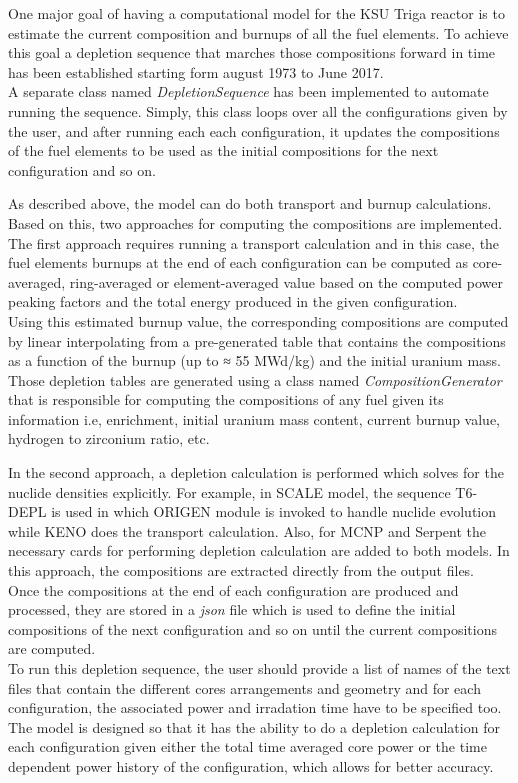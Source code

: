 \documentclass[review,number,sort&compress,12pt]{elsarticle}
\begin{document}
One major goal of having a computational model for the KSU Triga reactor is to estimate the current composition and burnups of all the fuel elements. To achieve this goal a depletion sequence that marches those compositions forward in time has been established starting form august 1973 to June 2017.\\
A separate class named \emph{DepletionSequence} has been implemented to automate running the sequence. 
Simply, this class loops over all the configurations given by the user, and after running each each configuration, it updates the compositions of the fuel elements to be used as the initial compositions for the next configuration and so on.

As described above, the model can do both transport and burnup calculations. Based on this, two approaches for computing the compositions are implemented.\\
The first approach requires running a transport calculation and in this case, the fuel elements burnups at the end of each configuration can be computed as core-averaged, ring-averaged or element-averaged value based on the computed power peaking factors and the total energy produced in the given configuration. \\
Using this estimated burnup value, the corresponding compositions are
computed by linear interpolating from a pre-generated table that contains the compositions as
a function of the burnup (up to ≈ 55 MWd/kg) and the initial uranium mass.
Those depletion tables are generated using a class named \emph{CompositionGenerator} that is responsible for computing the compositions of any fuel given its information i.e, enrichment, initial uranium mass content, current burnup value, hydrogen to zirconium ratio, etc.

In the second approach, a depletion calculation is performed which solves for the nuclide densities explicitly. For example, in SCALE model, the sequence T6-DEPL is used in which ORIGEN module is invoked to handle nuclide evolution while KENO does the transport calculation.
Also, for MCNP and Serpent the necessary cards for performing depletion calculation are added to both models. In this approach, the compositions are extracted directly from the output files. \\
Once the compositions at the end of each configuration are produced and processed, they are stored in a \emph{json} file which is used to define the initial compositions of the next configuration and so on until the current compositions are computed.\\
To run this depletion sequence, the user should provide a list of names of the text files that contain the different cores arrangements and geometry and for each configuration, the associated power and irradation time have to be specified too. The model is designed so that it has the ability to do a depletion calculation for each configuration given either the total time averaged core power or the time dependent power history of the configuration, which allows for better accuracy.
\end{document}
